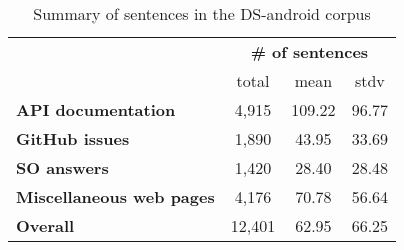 \begin{table}[H]
\centering    
\begin{footnotesize}
\begin{threeparttable}
\begin{tabular}{lccc}


& \multicolumn{3}{c}{\textbf{\# of sentences}}
\\ \cmidrule(l){2-4} 
& total & mean & stdv  \\

\hline

\textbf{API documentation} 
& 4,915 & 109.22 & 96.77
\\
\textbf{GitHub issues} 
& 1,890 &  43.95 & 33.69
\\
\textbf{SO answers} 
& 1,420 & 28.40 & 28.48 
\\
\textbf{Miscellaneous web pages} 
& 4,176 & 70.78 & 56.64 
\\

\hline
\textbf{Overall} 
& 12,401 & 62.95 & 66.25 
\\
\hline

\end{tabular}
\end{threeparttable}
\end{footnotesize}
\caption{Summary of sentences in the \acs{DS-android} corpus}
\label{tbl:corpus-summary}
\end{table}


